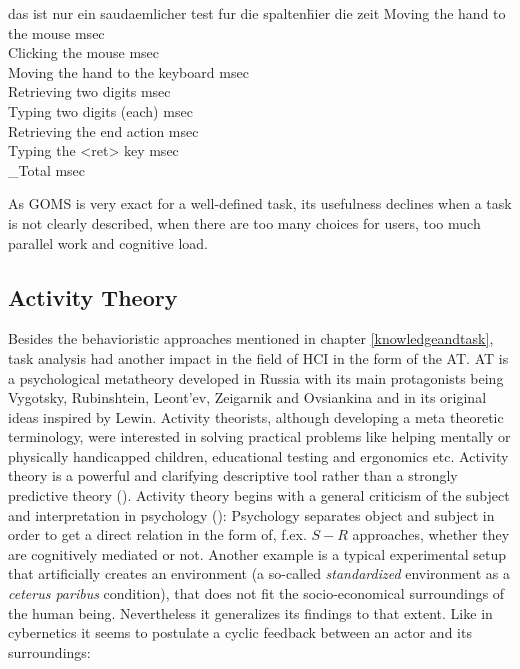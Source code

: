 \begin{tabbing}
das ist nur ein saudaemlicher test fur die spalten\=  hier die zeit\kill
Moving the hand to the mouse  msec\\
Clicking the mouse  msec\\
Moving the hand to the keyboard  msec\\
Retrieving two digits  msec\\
Typing two digits (each) msec\\
Retrieving the end action  msec\\
Typing the <ret> key  msec\\
\_Total  msec
\end{tabbing}

As \ac{GOMS} is very exact for a well-defined task, its usefulness declines when a task is not clearly described, when there are too many choices for users, too much parallel work and cognitive load. 

\subsection{Activity Theory}
Besides the behavioristic approaches mentioned in chapter \ref{knowledgeandtask}, task analysis had another impact in the field of \ac{HCI} in the form of the \ac{AT}. \acs{AT} is a psychological metatheory developed in Russia with its main protagonists being Vygotsky, Rubinshtein, Leont'ev, Zeigarnik and Ovsiankina  and in its original ideas inspired by Lewin. Activity theorists, although developing a meta theoretic terminology, were interested in solving practical problems like helping mentally or physically handicapped children, educational testing and ergonomics etc. Activity theory is a powerful and clarifying descriptive tool rather than a strongly predictive theory (\cite{nardi1996activity}). Activity theory begins with a general criticism of the subject and interpretation in psychology (\cite{leont1974problem}): Psychology separates object and subject in order to get a direct relation in the form of, f.ex. $S-R$ approaches, whether they are cognitively mediated or not. Another example is a typical experimental setup that artificially creates an environment (a so-called \textit{standardized} environment as a \textit{ceterus paribus} condition), that does not fit the socio-economical surroundings of the human being. Nevertheless it generalizes its findings to that extent. Like in cybernetics it seems to postulate a cyclic feedback between an actor and its surroundings: 

